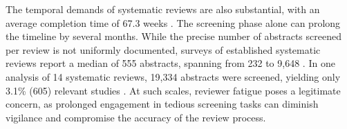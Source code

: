 \documentclass[10pt,oneside]{book}
\begin{document}
The temporal demands of systematic reviews are also substantial, with an average completion time of 67.3 weeks \cite{borah_analysis_2017}. The screening phase alone can prolong the timeline by several months. While the precise number of abstracts screened per review is not uniformly documented, surveys of established systematic reviews report a median of 555 abstracts, spanning from 232 to 9,648 \cite{nama_successful_2021}. In one analysis of 14 systematic reviews, 19,334 abstracts were screened, yielding only 3.1\% (605) relevant studies \cite{nama_successful_2021}. At such scales, reviewer fatigue poses a legitimate concern, as prolonged engagement in tedious screening tasks can diminish vigilance and compromise the accuracy of the review process.




\end{document}
